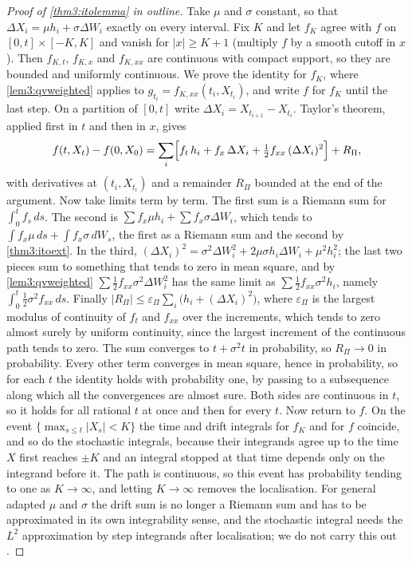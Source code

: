 \begin{chapterrefs}
\begin{proof}[Proof of \cref{thm3:itolemma} in outline]
Take $\mu$ and $\sigma$ constant, so that $\Delta X_i=\mu h_i+\sigma\Delta W_i$ exactly on every interval. Fix
$K$ and let $f_K$ agree with $f$ on $[0,t]\times[-K,K]$ and vanish for $\lvert x\rvert\ge K+1$ (multiply $f$ by
a smooth cutoff in $x$). Then $f_{K,t}$, $f_{K,x}$ and $f_{K,xx}$ are continuous with compact support, so
they are bounded and uniformly continuous. We prove the identity for $f_K$, where
\cref{lem3:qvweighted} applies to $g_{t_i}=f_{K,xx}(t_i,X_{t_i})$, and write $f$ for $f_K$ until the last
step. On a partition of $[0,t]$ write $\Delta X_i=X_{t_{i+1}}-X_{t_i}$.
Taylor's theorem, applied first in $t$ and then in $x$, gives
\begin{equation*}
  f(t,X_t)-f(0,X_0) = \sum_i\Bigl[f_t\,h_i + f_x\,\Delta X_i + \tfrac12 f_{xx}\,(\Delta X_i)^2\Bigr] + R_\Pi ,
\end{equation*}
with derivatives at $(t_i,X_{t_i})$ and a remainder $R_\Pi$ bounded at the end of the argument.
Now take limits term by term. The first sum is a Riemann sum for $\int_0^tf_s\,ds$. The second is
$\sum f_x\mu h_i+\sum f_x\sigma\Delta W_i$, which tends to $\int f_x\mu\,ds+\int f_x\sigma\,dW_s$, the
first as a Riemann sum and the second by \cref{thm3:itoext}. In the third,
$(\Delta X_i)^2=\sigma^2\Delta W_i^2+2\mu\sigma h_i\Delta W_i+\mu^2h_i^2$; the last two pieces sum to
something that tends to zero in mean square, and by \cref{lem3:qvweighted}
$\sum\tfrac12f_{xx}\sigma^2\Delta W_i^2$ has the same limit as $\sum\tfrac12f_{xx}\sigma^2h_i$, namely
$\int_0^t\tfrac12\sigma^2f_{xx}\,ds$. Finally $|R_\Pi|\le\varepsilon_\Pi\sum_i\bigl(h_i+(\Delta X_i)^2\bigr)$, where $\varepsilon_\Pi$ is the largest
modulus of continuity of $f_t$ and $f_{xx}$ over the increments, which tends to zero almost surely by
uniform continuity, since the largest increment of the continuous path tends to zero. The sum converges to $t+\sigma^2t$ in
probability, so $R_\Pi\to0$ in probability. Every other term converges in mean square, hence in
probability, so for each $t$ the identity holds with probability one, by passing to a subsequence
along which all the convergences are almost sure. Both sides are continuous in $t$, so it holds for
all rational $t$ at once and then for every $t$. Now return to $f$. On the event $\{\max_{s\le t}\lvert X_s\rvert< K\}$ the time and drift integrals
for $f_K$ and for $f$ coincide, and so do the stochastic integrals, because their integrands agree
up to the time $X$ first reaches $\pm K$ and an integral stopped at that time depends only on the
integrand before it. The path is continuous, so this event has probability tending to one as
$K\to\infty$, and letting $K\to\infty$ removes the localisation. For
general adapted $\mu$ and $\sigma$ the drift sum is no longer a Riemann sum and has to be approximated in
its own integrability sense, and the stochastic integral needs the $L^2$ approximation by step
integrands after localisation; we do not carry this out \parencite[Section~3.3]{karatzas1998}.
\end{proof}


\end{chapterrefs}
